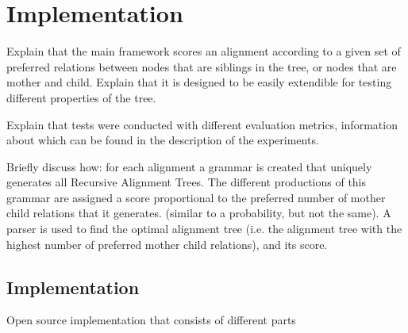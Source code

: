 \documentclass{report}
\theoremstyle{definition}
\theoremstyle{plain}
\begin{document}




\chapter{Implementation}




Explain that the main framework scores an alignment according to a given set of preferred relations between nodes that are siblings in the tree, or nodes that are mother and child. Explain that it is designed to be easily extendible for testing different properties of the tree.

Explain that tests were conducted with different evaluation metrics, information about which can be found in the description of the experiments.

Briefly discuss how: for each alignment a grammar is created that uniquely generates all Recursive Alignment Trees. The different productions of this grammar are assigned a score proportional to the preferred number of mother child relations that it generates. (similar to a probability, but not the same). A parser is used to find the optimal alignment tree (i.e. the alignment tree with the highest number of preferred mother child relations), and its score.


\section{Implementation}

Open source implementation that consists of different parts
\end{document}
